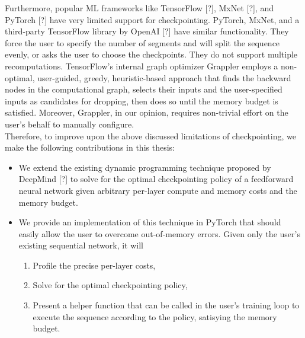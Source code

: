 Furthermore, popular ML frameworks like TensorFlow [?], MxNet [?], and PyTorch [?] have very limited support for checkpointing. PyTorch, MxNet, and a third-party TensorFlow library by OpenAI [?] have similar functionality. They force the user to specify the number of segments and will split the sequence evenly, or asks the user to choose the checkpoints. They do not support multiple recomputations. TensorFlow's internal graph optimizer Grappler employs a non-optimal, user-guided, greedy, heuristic-based approach that finds the backward nodes in the computational graph, selects their inputs and the user-specified inputs as candidates for dropping, then does so until the memory budget is satisfied. Moreover, Grappler, in our opinion, requires non-trivial effort on the user's behalf to manually configure. \\

Therefore, to improve upon the above discussed limitations of checkpointing, we make the following contributions in this thesis:
\begin{itemize}
    \item We extend the existing dynamic programming technique proposed by DeepMind [?] to solve for the optimal checkpointing policy of a feedforward neural network given arbitrary per-layer compute and memory costs and the memory budget.
    \item We provide an implementation of this technique in PyTorch that should easily allow the user to overcome out-of-memory errors. Given only the user's existing sequential network, it will
    \begin{enumerate}
        \item Profile the precise per-layer costs,
        \item Solve for the optimal checkpointing policy,
        \item Present a helper function that can be called in the user's training loop to execute the sequence according to the policy, satisying the memory budget.
    \end{enumerate}
\end{itemize}
